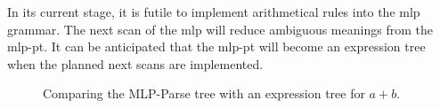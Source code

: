 In its current stage, it is futile to implement arithmetical rules into the \gls{mlp} grammar. The next scan of the \gls{mlp} will reduce ambiguous meanings from the \gls{mlp-pt}. It can be anticipated that the \gls{mlp-pt} will become an expression tree when the planned next scans are implemented.

\begin{figure}[!ht]
    \centering
    \hspace{0.5cm}
    \caption{Comparing the MLP-Parse tree with an expression tree for $a+b$.}
    \label{fig:tree-compare}
\end{figure}